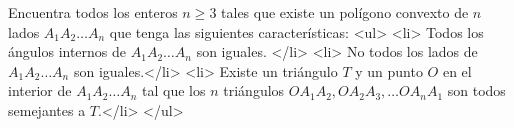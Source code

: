 Encuentra todos los enteros $n\geq 3$ tales que existe un polígono convexto de $n$ lados $A_1A_2\dots A_n$ que tenga las siguientes características:
<ul>
<li> Todos los ángulos internos de $A_1A_2\dots A_n$ son iguales. </li>
<li> No todos los lados de $A_1A_2\dots A_n$ son iguales.</li>
<li> Existe un triángulo $T$ y un punto $O$ en el interior de $A_1A_2\dots A_n$ tal que los $n$ triángulos $OA_1A_2, OA_2A_3,\dots OA_nA_1$ son todos semejantes a $T$.</li>
</ul>